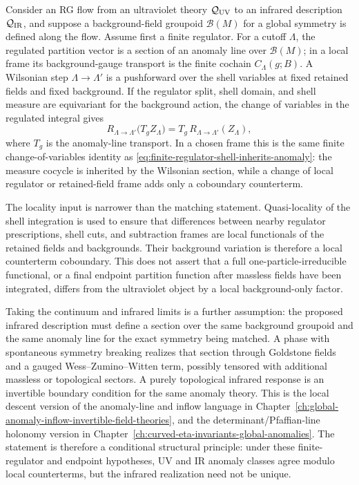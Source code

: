 \begin{remark}
\label{rem:anomaly-matching-as-line-equality}
Consider an RG flow from an ultraviolet theory \(\mathcal Q_{\rm UV}\) to an
infrared description \(\mathcal Q_{\rm IR}\), and suppose a background-field
groupoid \(\mathcal B(M)\) for a global symmetry is defined along the flow.
Assume first a finite regulator.  For a cutoff \(\Lambda\), the regulated
partition vector is a section of an anomaly line over \(\mathcal B(M)\); in a
local frame its background-gauge transport is the finite cochain
\(C_\Lambda(g;B)\).  A Wilsonian step
\(\Lambda\to\Lambda'\) is a pushforward over the shell variables at fixed
retained fields and fixed background.  If the regulator split, shell domain,
and shell measure are equivariant for the background action, the change of
variables in the regulated integral gives
\[
  R_{\Lambda\to\Lambda'}\bigl(T_g Z_\Lambda\bigr)
  =
  T_g\,R_{\Lambda\to\Lambda'}(Z_\Lambda),
\]
where \(T_g\) is the anomaly-line transport.  In a chosen frame this is the
same finite change-of-variables identity as
\eqref{eq:finite-regulator-shell-inherits-anomaly}: the measure cocycle is
inherited by the Wilsonian section, while a change of local regulator or
retained-field frame adds only a coboundary counterterm.

The locality input is narrower than the matching statement.  Quasi-locality of
the shell integration is used to ensure that differences between nearby
regulator prescriptions, shell cuts, and subtraction frames are local
functionals of the retained fields and backgrounds.  Their background
variation is therefore a local counterterm coboundary.  This does not assert
that a full one-particle-irreducible functional, or a final endpoint partition
function after massless fields have been integrated, differs from the
ultraviolet object by a local background-only factor.

Taking the continuum and infrared limits is a further assumption: the proposed
infrared description must define a section over the same background groupoid
and the same anomaly line for the exact symmetry being matched.  A phase with
spontaneous symmetry breaking realizes that section through Goldstone fields
and a gauged Wess--Zumino--Witten term, possibly tensored with additional
massless or topological sectors.  A purely topological infrared response is an
invertible boundary condition for the same anomaly theory.  This is the local
descent version of the anomaly-line and inflow language in
Chapter~\ref{ch:global-anomaly-inflow-invertible-field-theories}, and the
determinant/Pfaffian-line holonomy version in
Chapter~\ref{ch:curved-eta-invariants-global-anomalies}.  The statement is
therefore a conditional structural principle: under these finite-regulator and
endpoint hypotheses, UV and IR anomaly classes agree modulo local
counterterms, but the infrared realization need not be unique.
\end{remark}


